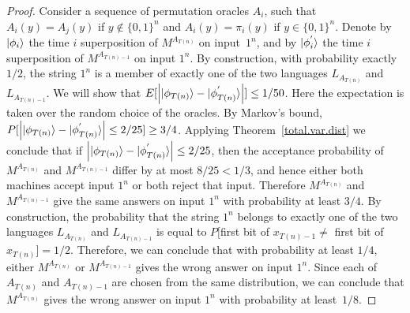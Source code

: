 \begin{proof}
Consider a sequence of permutation oracles $A_i$, such that
$A_i (y) = A_j (y)$ if $y \notin \{0,1\}^n$ and
$A_i (y) = \pi_i (y)$ if $y \in \{0,1\}^n$.
Denote by ${| \phi_i \rangle}$ the time $i$
superposition of $M^{A_{T(n)}}$ on input~$1^n$,
and by ${| \phi^{'}_i \rangle}$ the time $i$
superposition of $M^{A_{T(n)-1}}$ on input $1^n$.
By construction, with probability exactly $1/2$,
the string $1^n$ is a member of exactly one of
the two languages $L_{A_{T(n)}}$ and~$L_{A_{T(n)-1}}$.
We will show that
$E[{\left| {| \phi_{T(n)} \rangle} - {| \phi^{'}_{T(n)} \rangle} \right|}] \leq 1/50$.
Here the expectation is taken over
the random choice of the oracles. By Markov's bound,
\mbox{$P[{\left| {| \phi_{T(n)} \rangle}-{| \phi^{'}_{T(n)} \rangle} \right|}\leq 2/25]\geq3/4$}.
Applying Theorem~\ref{total.var.dist} we conclude that if
${\left| {| \phi_{T(n)} \rangle} - {| \phi^{'}_{T(n)} \rangle} \right|} \leq 2/25$, then
the acceptance probability of $M^{A_{T(n)}}$ and $M^{A_{T(n)-1}}$ differ by
at most $8/25 < 1/3$, and hence either both machines accept input $1^n$ or
both reject that input. Therefore
$M^{A_{T(n)}}$ and $M^{A_{T(n)-1}}$ give the same
answers on input $1^n$ with probability at least $3/4$.
By construction, the probability that the string $1^n$ belongs to
exactly one of the two languages $L_{A_{T(n)}}$ and $L_{A_{T(n)-1}}$
is equal to $P[$first bit of $x_{T(n)-1} \neq$ first bit
of $x_{T(n)}] = 1/2$.
Therefore, we can conclude that with probability at least
$1/4$, either $M^{A_{T(n)}}$ or $M^{A_{T(n)-1}}$ gives
the wrong answer on input $1^n$.
Since each of $A_{T(n)}$ and $A_{T(n)-1}$ are chosen from
the same distribution, we can conclude that
$M^{A_{T(n)}}$ gives the wrong answer on input $1^n$ with probability
at least~$1/8$.


\end{proof}
